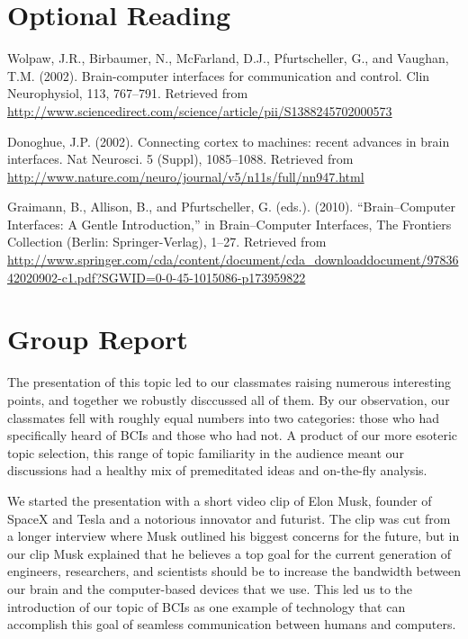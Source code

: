\documentclass[12pt]{article}
\begin{document}
\section*{Optional Reading}

\begin{enumerate}[leftmargin=0.6cm, label={[\arabic*]}]

\setcounter{enumi}{2}

\item Wolpaw, J.R., Birbaumer, N., McFarland, D.J., Pfurtscheller, G., and Vaughan, T.M. (2002). Brain-computer interfaces for communication and control. Clin Neurophysiol, 113, 767--791. Retrieved from \url{http://www.sciencedirect.com/science/article/pii/S1388245702000573}

\item Donoghue, J.P. (2002). Connecting cortex to machines: recent advances in brain interfaces. Nat Neurosci. 5 (Suppl), 1085--1088. Retrieved from \url{http://www.nature.com/neuro/journal/v5/n11s/full/nn947.html}

\sloppy

\item Graimann, B., Allison, B., and Pfurtscheller, G. (eds.). (2010). “Brain–Computer Interfaces: A Gentle Introduction,” in Brain–Computer Interfaces, The Frontiers Collection (Berlin: Springer-Verlag), 1--27. Retrieved from \url{http://www.springer.com/cda/content/document/cda_downloaddocument/9783642020902-c1.pdf?SGWID=0-0-45-1015086-p173959822}

\end{enumerate}

\newpage

\section*{Group Report}

\doublespacing

The presentation of this topic led to our classmates raising numerous interesting points, and together we robustly disccussed all of them. By our observation, our classmates fell with roughly equal numbers into two categories: those who had specifically heard of BCIs and those who had not. A product of our more esoteric topic selection, this range of topic familiarity in the audience meant our discussions had a healthy mix of premeditated ideas and on-the-fly analysis.

We started the presentation with a short video clip of Elon Musk, founder of SpaceX and Tesla and a notorious innovator and futurist. The clip was cut from a longer interview where Musk outlined his biggest concerns for the future, but in our clip Musk explained that he believes a top goal for the current generation of engineers, researchers, and scientists should be to increase the bandwidth between our brain and the computer-based devices that we use. This led us to the introduction of our topic of BCIs as one example of technology that can accomplish this goal of seamless communication between humans and computers.
\end{document}
